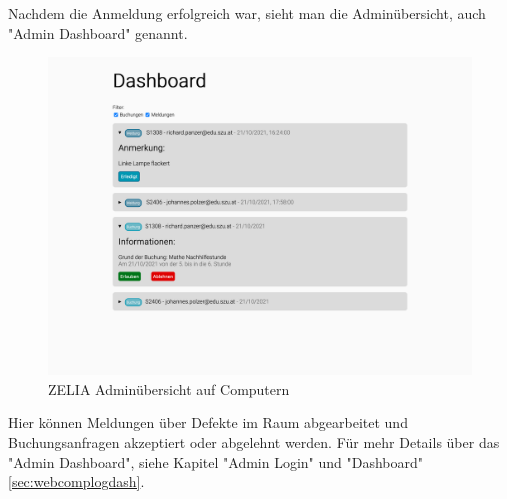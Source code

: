 Nachdem die Anmeldung erfolgreich war, sieht man die Adminübersicht, auch "Admin Dashboard" genannt.

\begin{figure}[H]
    \centering
    \includegraphics[width=120mm]{media/WebComponents/AdminSeite_light.png}
    \caption{ZELIA Adminübersicht auf Computern}
\end{figure}

Hier können Meldungen über Defekte im Raum abgearbeitet und Buchungsanfragen akzeptiert oder abgelehnt werden.
Für mehr Details über das "Admin Dashboard", siehe Kapitel "Admin Login" und "Dashboard" \ref{sec:webcomplogdash}.
